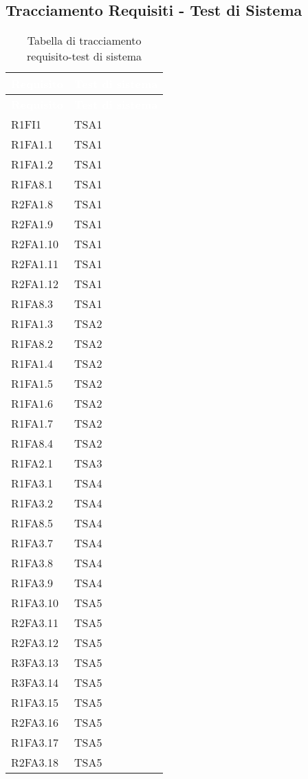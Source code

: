 \subsection{Tracciamento Requisiti - Test di Sistema}
{
\renewcommand{\arraystretch}{1.5}
\centering
\begin{longtable}{C{4cm} C{4cm}}
\caption{Tabella di tracciamento requisito-test di sistema}\\
\textcolor{white}{\textbf{Requisito}} & \textcolor{white}{\textbf{Test di sistema}}\\	
\endfirsthead
{}
\textcolor{white}{\textbf{Requisito}} & \textcolor{white}{\textbf{Test di sistema}}\\	
\endhead

R1FI1 & TSA1  \\
R1FA1.1 & TSA1  \\
R1FA1.2 & TSA1  \\
R1FA8.1 & TSA1  \\
R2FA1.8 & TSA1  \\
R2FA1.9 & TSA1  \\  %
R2FA1.10 & TSA1  \\  %
R2FA1.11 & TSA1  \\  %
R2FA1.12 & TSA1  \\  %
R1FA8.3 & TSA1  \\

R1FA1.3 & TSA2  \\
R1FA8.2 & TSA2  \\
R1FA1.4 & TSA2  \\
R1FA1.5 & TSA2  \\
R1FA1.6 & TSA2  \\
R1FA1.7 & TSA2  \\
R1FA8.4 & TSA2  \\

R1FA2.1 & TSA3  \\

R1FA3.1 & TSA4  \\
R1FA3.2 & TSA4  \\
R1FA8.5 & TSA4  \\
R1FA3.7 & TSA4  \\
R1FA3.8 & TSA4  \\
R1FA3.9 & TSA4  \\

R1FA3.10 & TSA5  \\
R2FA3.11 & TSA5  \\
R2FA3.12 & TSA5  \\
R3FA3.13 & TSA5  \\
R3FA3.14 & TSA5  \\
R1FA3.15 & TSA5  \\
R2FA3.16 & TSA5  \\
R1FA3.17 & TSA5  \\
R2FA3.18 & TSA5  \\


\end{longtable}}
